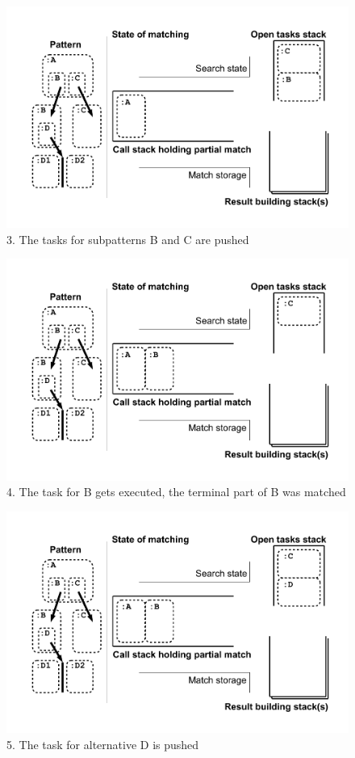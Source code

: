 \begin{figure}[htbp]
  \centering
  \includegraphics[width=\textwidth]{fig/Passungszustand3}
  \caption{3. The tasks for subpatterns B and C are pushed}
  \label{figmatchingstate3}
\end{figure}

\begin{figure}[htbp]
  \centering
  \includegraphics[width=\textwidth]{fig/Passungszustand4}
  \caption{4. The task for B gets executed, the terminal part of B was matched}
  \label{figmatchingstate4}
\end{figure}

\begin{figure}[htbp]
  \centering
  \includegraphics[width=\textwidth]{fig/Passungszustand5}
  \caption{5. The task for alternative D is pushed}
  \label{figmatchingstate5}
\end{figure}

